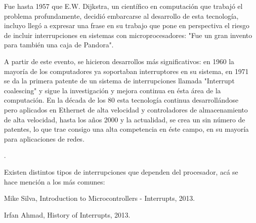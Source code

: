 \documentclass[12pt,a4paper]{report}
\begin{document}
   \vspace{1cm}   
   
      Fue hasta 1957 que E.W. Dijkstra, un científico en computación que trabajó el problema profundamente, decidió embarcarse al desarrollo de esta tecnología, incluyo llegó a expresar una frase en su trabajo que pone en perspectiva el riesgo de incluir interrupciones en sistemas con microprocesadores: "Fue un gran invento para también una caja de Pandora".
      
  \vspace{1cm}
  
    A partir de este evento, se hicieron desarrollos más significativos: en 1960 la mayoría de los computadores ya soportaban interruptores en su sistema, en 1971 se da la primera patente de un sistema de interrupciones llamada "Interrupt coalescing" y sigue la investigación y mejora continua en ésta área de la computación. En la década de los 80 esta tecnología continua desarrollándose pero aplicados en Ethernet de alta velocidad y controladores de almacenamiento de alta velocidad, hasta los años 2000 y la actualidad, se crea un sin número de patentes, lo que trae consigo una alta competencia en éste campo, en su mayoría para aplicaciones de redes.
      
      \cite{Irfan Ahmad 2014}.
   
   \vspace{1cm}
   
       Existen distintos tipos de interrupciones que dependen del procesador, acá se hace mención a los más comunes:
       
       
       
       
    
         
    
        

\begin{thebibliography}{0}



   Mike Silva, Introduction to Microcontrollers - Interrupts, 2013.
  
   Irfan Ahmad, History of Interrupts, 2013.
  
\end{thebibliography}
\end{document}
